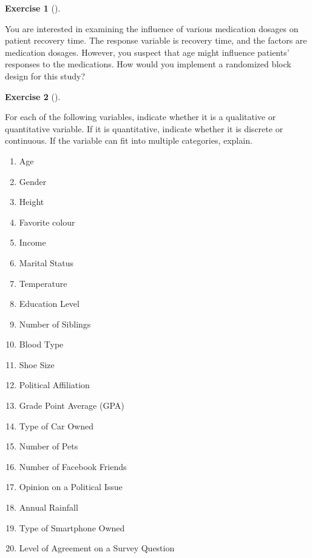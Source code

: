 \documentclass[
  letterpaper,
  DIV=11,
  numbers=noendperiod]{scrreprt}
\providecommand{\tightlist}{%
  \setlength{\itemsep}{0pt}\setlength{\parskip}{0pt}}\usepackage{longtable,booktabs,array}
\theoremstyle{definition}
\newtheorem{exercise}{Exercise}[chapter]
\theoremstyle{definition}
\theoremstyle{definition}
\theoremstyle{remark}
\begin{document}
\begin{exercise}[]\protect\hypertarget{exr-10.24}{}\label{exr-10.24}

You are interested in examining the influence of various medication
dosages on patient recovery time. The response variable is recovery
time, and the factors are medication dosages. However, you suspect that
age might influence patients' responses to the medications. How would
you implement a randomized block design for this study?

\end{exercise}

\begin{exercise}[]\protect\hypertarget{exr-10.25}{}\label{exr-10.25}

For each of the following variables, indicate whether it is a
qualitative or quantitative variable. If it is quantitative, indicate
whether it is discrete or continuous. If the variable can fit into
multiple categories, explain.

\begin{enumerate}
\def\labelenumi{\alph{enumi}.}
\tightlist
\item
  Age
\item
  Gender
\item
  Height
\item
  Favorite colour
\item
  Income
\item
  Marital Status
\item
  Temperature
\item
  Education Level
\item
  Number of Siblings
\item
  Blood Type
\item
  Shoe Size
\item
  Political Affiliation
\item
  Grade Point Average (GPA)
\item
  Type of Car Owned
\item
  Number of Pets
\item
  Number of Facebook Friends
\item
  Opinion on a Political Issue
\item
  Annual Rainfall
\item
  Type of Smartphone Owned
\item
  Level of Agreement on a Survey Question
\end{enumerate}

\end{exercise}
\end{document}
